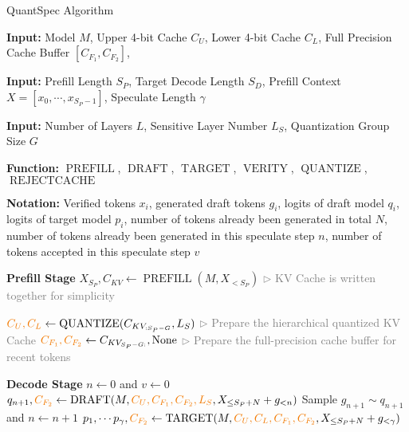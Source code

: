 \begin{algorithm*}[h]
\caption{QuantSpec Algorithm} \label{alg:our_algorithm}
\begin{algorithmic}[1]
\setlength{\itemsep}{3pt}
\item[] \textbf{Input:} Model $M$, Upper 4-bit Cache $C_U$, Lower 4-bit Cache $C_L$, Full Precision Cache Buffer $[C_{F_1}, C_{F_2}]$, 
\item[] \textbf{Input:} Prefill Length $S_P$, Target Decode Length $S_D$, Prefill Context $X = [x_0, \cdots, x_{S_P-1}]$, Speculate Length $\gamma$
\item[] \textbf{Input:} Number of Layers $L$, Sensitive Layer Number $L_S$, Quantization Group Size $G$
\item[] \textbf{Function: } $\operatorname{PREFILL}$, $\operatorname{DRAFT}$, $\operatorname{TARGET}$, $\operatorname{VERITY}$, $\operatorname{QUANTIZE}$, $\operatorname{REJECTCACHE}$
\item[] \textbf{Notation: } Verified tokens $x_i$, generated draft tokens $g_i$, logits of draft model $q_i$, logits of target model $p_i$, number of tokens already been generated in total $N$, number of tokens already been generated in this speculate step $n$, number of tokens accepted in this speculate step $v$

\item[] \textbf{Prefill Stage}
\STATE $X_{S_P}, C_{KV} \leftarrow \operatorname{PREFILL}(M, X_{<S_P})$  \hfill \textcolor{gray}{$\triangleright$ KV Cache is written together for simplicity}

\STATE $\textcolor{orange!95!black}{C_U, C_L} \leftarrow \operatorname{QUANTIZE}(C_{KV_{:S_P-G}}, L_S)$ \hfill \textcolor{gray}{$\triangleright$ Prepare the hierarchical quantized KV Cache}
\STATE $\textcolor{orange!95!black}{C_{F_1}, C_{F_2}} \leftarrow C_{KV_{S_P-G:}}, \operatorname{None}$ \hfill \textcolor{gray}{$\triangleright$ Prepare the full-precision cache buffer for recent tokens}

\item[] \textbf{Decode Stage}
    \STATE $n \leftarrow 0$ and $v \leftarrow 0$
        \STATE $q_{n + 1}, \textcolor{orange!95!black}{C_{F_2}} \leftarrow \operatorname{DRAFT}(M, \textcolor{orange!95!black}{C_U, C_{F_1}, C_{F_2}, L_S}, X_{\leq S_P + N} + g_{<n})$
        \STATE Sample $g_{n + 1} \sim q_{n + 1}$ and $n \leftarrow n + 1$
    \ENDWHILE
    \STATE $p_1, \cdots p_{\gamma}, \textcolor{orange!95!black}{C_{F_2}} \leftarrow \operatorname{TARGET}(M, \textcolor{orange!95!black}{C_U, C_L, C_{F_1}, C_{F_2}}, X_{\leq S_P + N} + g_{<\gamma})$


\end{algorithmic}
\end{algorithm*}

